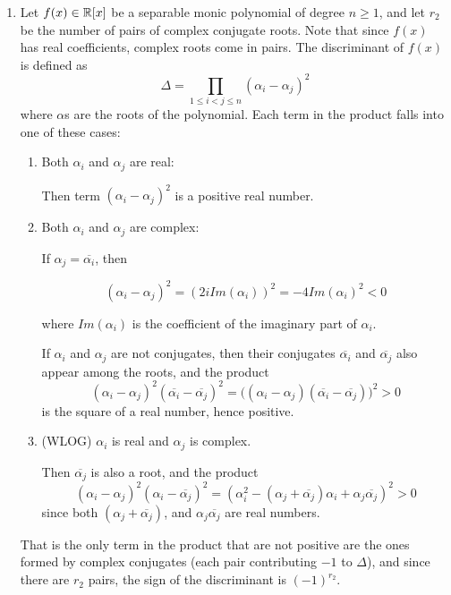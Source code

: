 \documentclass[12pt]{article}
\begin{document}
\begin{solution}
    \bbni
    \begin{enumerate}
        \item[(a)] Let $f(x) \in \mathbb R[x]$ be a separable monic polynomial of degree $n \geq 1$, and let $r_2$ be the number of pairs of complex conjugate roots. Note that since $f(x)$ has real coefficients, complex roots come in pairs. The discriminant of $f(x)$ is defined as 
        \[\Delta = \prod_{1 \leq i < j \leq n} (\alpha_i - \alpha_j)^2\]
        where $\alpha$s are the roots of the polynomial. Each term in the product falls into one of these cases: 
        \begin{enumerate}
            \item Both $\alpha_i$ and $\alpha_j$ are real: 
            
            Then term $(\alpha_i - \alpha_j)^2$ is a positive real number. 
            \item Both $\alpha_i$ and $\alpha_j$ are complex: 

            If $\alpha_j = \overline{\alpha_i}$, then

            \[(\alpha_i - \alpha_j)^2 = (2iIm(\alpha_i))^2 = -4Im(\alpha_i)^2 < 0\]

            where $Im(\alpha_i)$ is the coefficient of the imaginary part of $\alpha_i$. 

            If $\alpha_i$ and $\alpha_j$ are not conjugates, then their conjugates $\overline{\alpha_i}$ and $\overline{\alpha_j}$ also appear among the roots,
            and the product            
            \[ (\alpha_i - \alpha_j)^2 (\overline{\alpha_i} - \overline{\alpha_j})^2 = \big((\alpha_i - \alpha_j) (\overline{\alpha_i} - \overline{\alpha_j})\big)^2 > 0\]
            is the square of a real number, hence positive.
            
            \item (WLOG) $\alpha_i$ is real and $\alpha_j$ is complex. 
            
            Then $\overline{\alpha_j}$ is also a root, and the product
            \[({\alpha_i} - {\alpha_j})^2(\alpha_i - \overline{\alpha_j})^2  = (\alpha_i^2 - (\alpha_j + \overline{\alpha_j})\alpha_i + \alpha_j\overline{\alpha_j})^2  > 0\] 
            since both $(\alpha_j + \overline{\alpha_j})$, and $\alpha_j \overline{\alpha_j}$ are real numbers. 
        \end{enumerate}
        That is the only term in the product that are not positive are the ones formed by complex conjugates (each pair contributing $-1$ to $\Delta$), and since there are $r_2$ pairs, the sign of the discriminant is $(-1)^{r_2}$. 


\end{enumerate}
\end{solution}
\end{document}
